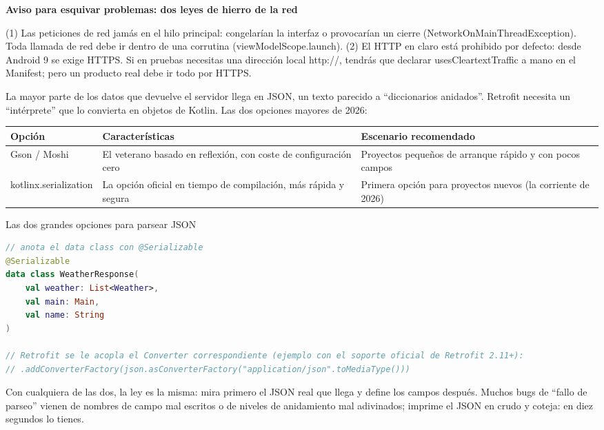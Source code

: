 \textbf{Aviso para esquivar problemas: dos leyes de hierro de la red}\par

(1) Las peticiones de red jamás en el hilo principal: congelarían la interfaz o provocarían un cierre (NetworkOnMainThreadException). Toda llamada de red debe ir dentro de una corrutina (viewModelScope.launch). (2) El HTTP en claro está prohibido por defecto: desde Android 9 se exige HTTPS. Si en pruebas necesitas una dirección local http://, tendrás que declarar usesCleartextTraffic a mano en el Manifest; pero un producto real debe ir todo por HTTPS.


La mayor parte de los datos que devuelve el servidor llega en JSON, un texto parecido a “diccionarios anidados”. Retrofit necesita un “intérprete” que lo convierta en objetos de Kotlin. Las dos opciones mayores de 2026:

\begin{center}
\begin{tabularx}{\linewidth}{|X|X|X|}
\hline
\textbf{Opción} & \textbf{Características} & \textbf{Escenario recomendado} \tabularnewline
\hline
Gson / Moshi & El veterano basado en reflexión, con coste de configuración cero & Proyectos pequeños de arranque rápido y con pocos campos \tabularnewline
kotlinx.serialization & La opción oficial en tiempo de compilación, más rápida y segura & Primera opción para proyectos nuevos (la corriente de 2026) \tabularnewline
\hline
\end{tabularx}
\end{center}

\begin{center}\small\color{gray}Las dos grandes opciones para parsear JSON\end{center}

\begin{lstlisting}[language=Kotlin]
// anota el data class con @Serializable
@Serializable
data class WeatherResponse(
    val weather: List<Weather>,
    val main: Main,
    val name: String
)

// Retrofit se le acopla el Converter correspondiente (ejemplo con el soporte oficial de Retrofit 2.11+):
// .addConverterFactory(json.asConverterFactory("application/json".toMediaType()))
\end{lstlisting}

Con cualquiera de las dos, la ley es la misma: mira primero el JSON real que llega y define los campos después. Muchos bugs de “fallo de parseo” vienen de nombres de campo mal escritos o de niveles de anidamiento mal adivinados; imprime el JSON en crudo y coteja: en diez segundos lo tienes.

